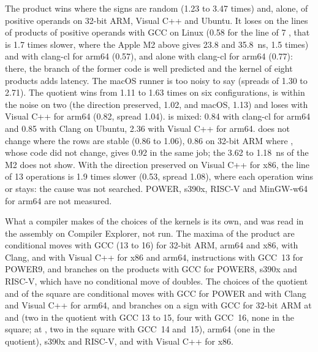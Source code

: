 \documentclass[12pt,a4paper,twoside,openright]{book}
\begin{document}
\noindent
The product wins where the signs are random (1.23 to 3.47 times) and, alone,
of positive operands on 32-bit ARM, Visual C++ and Ubuntu. It loses on the
lines of products of positive operands with GCC on Linux (0.58 for the line
of 7 \code{*}, that is 1.7 times slower, where the Apple M2 above gives 23.8
and 35.8~ns, 1.5 times) and with clang-cl for arm64 (0.57), and alone with
clang-cl for arm64 (0.77): there, the branch of the former code is well
predicted and the kernel of eight products adds latency. The macOS runner is
too noisy to say (spreads of 1.30 to 2.71). The quotient wins from 1.11 to
1.63 times on six configurations, is within the noise on two (the direction
preserved, 1.02, and macOS, 1.13) and loses with Visual C++ for arm64 (0.82,
spread 1.04).  is mixed: 0.84 with clang-cl for arm64 and 0.85
with Clang on Ubuntu, 2.36 with Visual C++ for arm64.  does not
change where the rows are stable (0.86 to 1.06), 0.86 on 32-bit ARM where
, whose code did not change, gives 0.92 in the same job; the 3.62
to 1.18~ns of the M2 does not show. With the direction preserved on Visual
C++ for x86, the line of 13 operations is 1.9 times slower (0.53, spread
1.08), where each operation wins or stays: the cause was not searched. POWER,
s390x, RISC-V and MinGW-w64 for arm64 are not measured.

\medskip
What a compiler makes of the choices of the kernels is its own, and was read
in the assembly on Compiler Explorer, not run. The maxima of the product are
conditional moves with GCC (13 to 16) for 32-bit ARM, arm64 and x86, with
Clang, and with Visual C++ for x86 and arm64,  instructions
with GCC~13 for POWER9, and branches on the products with GCC for POWER8,
s390x and RISC-V, which have no conditional move of doubles. The choices of
the quotient and of the square are conditional moves with GCC for POWER and
with Clang and Visual C++ for arm64, and branches on a sign with GCC for
32-bit ARM at  and  (two in the quotient with GCC 13
to 15, four with GCC~16, none in the square; at , two in the
square with GCC~14 and~15), arm64 (one in the quotient), s390x and RISC-V,
and with Visual C++ for x86.
\end{document}
